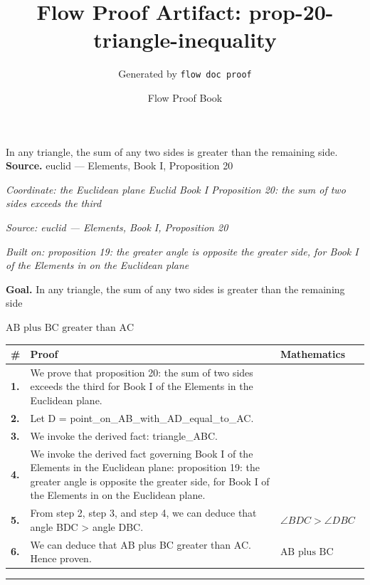 \documentclass[11pt]{article}
\title{Flow Proof Artifact: prop-20-triangle-inequality}
\author{Generated by \texttt{flow doc proof}}
\date{Flow Proof Book}
\theoremstyle{definition}
\begin{document}
\maketitle
In any triangle, the sum of any two sides is greater than the remaining side.\\[0.5em]
\textbf{Source.} euclid — Elements, Book I, Proposition 20\\[0.5em]
\bigskip
{}\par
\smallskip\noindent\textit{Coordinate: the Euclidean plane \cdot Euclid Book I \cdot Proposition 20: the sum of two sides exceeds the third}\par
\smallskip\noindent\textit{Source: euclid — Elements, Book I, Proposition 20}\par
\smallskip\noindent\textit{Built on: proposition 19: the greater angle is opposite the greater side, for Book I of the Elements in on the Euclidean plane}\par
\medskip
\noindent\textbf{Goal.} In any triangle, the sum of any two sides is greater than the remaining side\par
\noindent$\displaystyle \text{AB plus BC greater than AC}$\par
\medskip
\noindent
\begin{tabular}{@{} >{\raggedright\arraybackslash}p{} >{\raggedright\arraybackslash}p{} >{\raggedleft\arraybackslash}p{} @{}}
\textbf{\#} & \textbf{Proof} & \textbf{Mathematics} \\
\midrule
\textbf{1.} & We prove that proposition 20: the sum of two sides exceeds the third for Book I of the Elements in the Euclidean plane. & \\[0.45em]
\textbf{2.} & Let D = point\_on\_AB\_with\_AD\_equal\_to\_AC. & \\[0.45em]
\textbf{3.} & We invoke the derived fact: triangle\_ABC. & \\[0.45em]
\textbf{4.} & We invoke the derived fact governing Book I of the Elements in the Euclidean plane: proposition 19: the greater angle is opposite the greater side, for Book I of the Elements in on the Euclidean plane. & \\[0.45em]
\textbf{5.} & From step 2, step 3, and step 4, we can deduce that angle BDC > angle DBC. & $\displaystyle \angle BDC > \angle DBC$ \\[0.45em]
\textbf{6.} & We can deduce that AB plus BC greater than AC. Hence proven. & $\displaystyle \text{AB plus BC greater than AC}$ \\[0.45em]
\bottomrule
\end{tabular}
\label{thm:Geometry-Euclid Book I-proposition_20_the_sum_of_two_sides_exceeds_the_third}
\par\medskip\hrule
\end{document}
